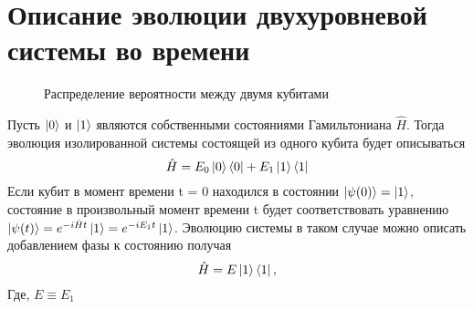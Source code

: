\documentclass[a4paper, 10pt]{article}
\begin{document}
        \section{Описание эволюции двухуровневой системы во времени}

    \begin{wrapfigure}{r}{0.5\textwidth}
        \captionsetup{justification= centering, margin = 0.1 cm}
        \caption{Распределение вероятности между двумя кубитами}
    \end{wrapfigure}
    Пусть $\ket{0}$ и $\ket{1}$ являются собственными состояниями Гамильтониана  $\hat{H}$. Тогда эволюция изолированной системы состоящей из одного кубита будет описываться 
    \\
    \begin{equation}
        \hat{H} = E_0 \ket{0}\bra{0} + E_1 \ket{1}\bra{1}
    \end{equation}
   Если кубит в момент времени t = 0 находился в состоянии $\ket{\psi(0)} = \ket{1}$, состояние в произвольный момент времени t будет соответствовать уравнению $\ket{\psi(t)}=e^{-i\hat{H}t}\ket{1} = e^{-iE_1t}\ket{1}$. 
   Эволюцию системы в таком случае можно описать добавлением фазы к состоянию получая
    \begin{equation}
        \hat{H} = E \ket{1}\bra{1}, 
    \end{equation}
    Где, $E \equiv E_1$
    
\end{document}
